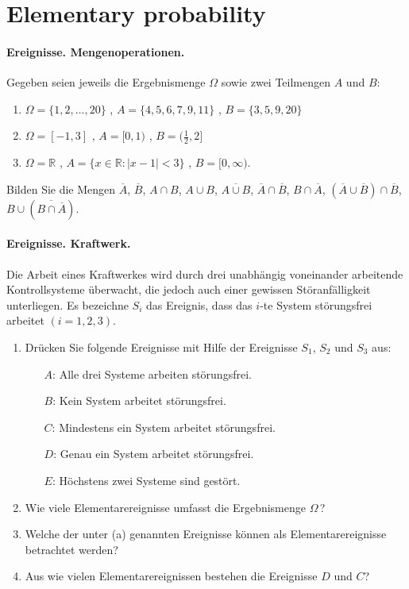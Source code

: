 

\section{Elementary probability}



\paragraph{Ereignisse. Mengenoperationen.}
Gegeben seien jeweils die Ergebnismenge $\Omega$ sowie zwei Teilmengen
$A$ und $B$:
\begin{enumerate}
\item $\Omega=\{1,2,...,20\}$ , $A=\{4,5,6,7,9,11\}$ , $B=\{3,5,9,20\}$
\item $\Omega=[-1,3]$ , $A=[0,1)$ , $B=(\frac{1}{2},2]$
\item $\Omega=\mathbb R$ , $A=\{x\in \mathbb R: |x-1|<3\}$ , $B=[0,\infty)$.
\end{enumerate}
Bilden Sie die Mengen $\overline{A}$, $\overline{B}$, $A\cap B$, $A\cup B$,
$\overline{ A\cup B}$, $\overline{A}\cap\overline{B}$, $B\cap\overline{A}$,
$(\overline{A}\cup\overline{B})\cap\overline{B}$,
$B\cup(\overline{B\cap\overline{A}})$.


\paragraph{Ereignisse. Kraftwerk.}
Die Arbeit eines Kraftwerkes wird durch drei unabhängig voneinander arbeitende
Kontrollsysteme überwacht, die jedoch auch einer gewissen Störanfälligkeit
unterliegen. Es bezeichne $S_i$ das Ereignis, dass das $i$-te System
störungsfrei arbeitet $(i=1,2,3)$.
\begin{enumerate}
\item Drücken Sie folgende Ereignisse mit Hilfe der Ereignisse $S_1$,
$S_2$ und $S_3$ aus:
\begin{itemize}
\item[$A$:] Alle drei Systeme arbeiten störungsfrei.
\item[$B$:] Kein System arbeitet störungsfrei.
\item[$C$:] Mindestens ein System arbeitet störungsfrei.
\item[$D$:] Genau ein System arbeitet störungsfrei.
\item[$E$:] Höchstens zwei Systeme sind gestört.
\end{itemize}
\item Wie viele Elementarereignisse umfasst die Ergebnismenge $\Omega$\,?
\item Welche der unter (a) genannten Ereignisse können als
Elementarereignisse betrachtet werden?
\item Aus wie vielen Elementarereignissen bestehen die Ereignisse $D$ und
$C$?
\end{enumerate}


